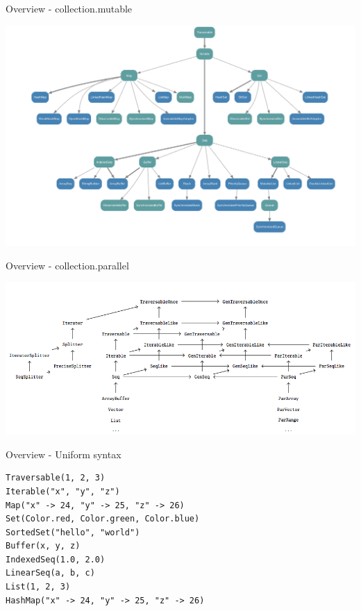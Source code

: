 \begin{frame}{Overview - collection.mutable}
\begin{center}
\includegraphics[width = \textwidth]{resources/collectionMutable.png}
\end{center}
\end{frame}

\begin{frame}{Overview - collection.parallel}
\begin{center}
\includegraphics[width = \textwidth]{resources/collectionParallel.png}
\end{center}
\end{frame}

\begin{frame}[fragile]{Overview - Uniform syntax}
\begin{lstlisting}
Traversable(1, 2, 3)
Iterable("x", "y", "z")
Map("x" -> 24, "y" -> 25, "z" -> 26)
Set(Color.red, Color.green, Color.blue)
SortedSet("hello", "world")
Buffer(x, y, z)
IndexedSeq(1.0, 2.0)
LinearSeq(a, b, c) 
List(1, 2, 3)
HashMap("x" -> 24, "y" -> 25, "z" -> 26) 
\end{lstlisting}
\end{frame}

